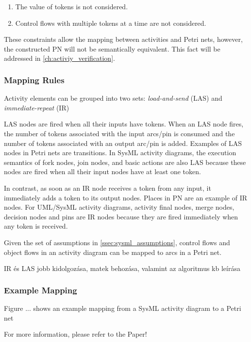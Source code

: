 \begin{enumerate}
	\item The value of tokens is not considered.
	\item Control flows with multiple tokens at a time are not considered.
\end{enumerate}

These constraints allow the mapping between activities and Petri nets, however, the constructed PN will not be semantically equivalent. This fact will be addressed in \autoref{ch:activiy_verification}.

\subsubsection{Mapping Rules}

Activity elements can be grouped into two sets: \emph{load-and-send} (LAS) and \emph{immediate-repeat} (IR)

LAS nodes are fired when all their inputs have tokens. When an LAS node fires, the number of tokens associated with the input arcs/pin is consumed and the number of tokens associated with an output arc/pin is added. Examples of LAS nodes in Petri nets are transitions. In SysML activity diagrams, the execution semantics of fork nodes, join nodes, and basic actions are also LAS because these nodes are fired when all their input nodes have at least one token.

In contrast, as soon as an IR node receives a token from any input, it immediately adds a token to its output nodes. Places in PN are an example of IR nodes. For UML/SysML activity diagrams, activity final nodes, merge nodes, decision nodes and pins are IR nodes because they are fired immediately when any token is received.

Given the set of assumptions in \autoref{ssec:sysml_assumptions}, control flows and object flows in an activity diagram can be mapped to arcs in a Petri net.

IR és LAS jobb kidolgozása, matek behozása, valamint az algoritmus kb leírása

\subsubsection{Example Mapping}

Figure ... shows an example mapping from a SysML activity diagram to a Petri net

For more information, please refer to the Paper!